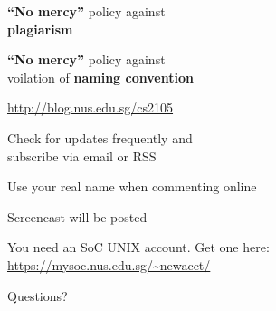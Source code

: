\begin{frame}
\begin{center}
\large
	\textbf{``No mercy''} policy against\\\textbf{plagiarism}
\end{center}
\end{frame}

\begin{frame}
\begin{center}
\large
	\textbf{``No mercy''} policy against\\voilation of \textbf{naming convention}
\end{center}
\end{frame}

\begin{frame}
\begin{center}
\large
	\url{http://blog.nus.edu.sg/cs2105}
\end{center}
\end{frame}

\begin{frame}
\begin{center}
\large
Check for updates frequently and\\subscribe via email or RSS
\end{center}
\end{frame}

\begin{frame}
\begin{center}
\large Use your real name when commenting online
\end{center}
\end{frame}

\begin{frame} \begin{center} \large
Screencast will be posted 
\end{center} \end{frame}

\begin{frame} \begin{center} \large
You need an SoC UNIX account.  Get one here:\\
\url{https://mysoc.nus.edu.sg/~newacct/}
\end{center} \end{frame}

\begin{frame}
\begin{center}
\large
Questions?
\end{center}
\end{frame}

